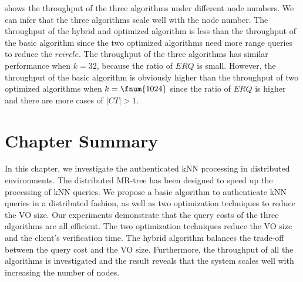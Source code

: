  shows the throughput of the three algorithms under different node numbers. We can infer that the three algorithms scale well with the node number. The throughput of the hybrid and optimized algorithm is less than the throughput of the basic algorithm since the two optimized algorithms need more range queries to reduce the $rcircle$. The throughput of the three algorithms has similar performance when $k=32$, because the ratio of $ERQ$ is small. However, the throughput of the basic algorithm is obviously higher than the throughput of two optimized algorithms when $k=\fnum{1024}$ since the ratio of $ERQ$ is higher and there are more cases of $|CT|>1$.

\section{Chapter Summary}\label{sec:knn:summary}
In this chapter, we investigate the authenticated kNN processing in distributed environments. The distributed MR-tree has been designed to speed up the processing of kNN queries. We propose a basic algorithm to authenticate kNN queries in a distributed fashion, as well as two optimization techniques to reduce the VO size. Our experiments demonstrate that the query costs of the three algorithms are all efficient. The two optimization techniques reduce the VO size and the client's verification time. The hybrid algorithm balances the trade-off between the query cost and the VO size. Furthermore, the throughput of all the algorithms is investigated and the result reveals that the system scales well with increasing the number of nodes.
